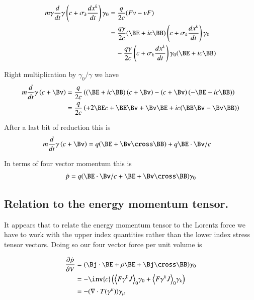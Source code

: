 \documentclass{article}
\begin{document}
\begin{align*}
m \gamma \frac{d}{dt} \gamma \left(c + \sigma_k \frac{dx^k}{dt}\right) \gamma_0
&= \frac{q}{2c}(F v - v F) \\
&=
\frac{q \gamma}{2c} 
(\BE + i c\BB) 
\left(c + \sigma_k \frac{dx^k}{dt}\right) \gamma_0
\\
&\quad -
\frac{q \gamma}{2c} 
\left(c + \sigma_k \frac{dx^k}{dt}\right) \gamma_0
(\BE + i c\BB) \\
\end{align*}

Right multiplication by $\gamma_0/\gamma$ we have
\begin{align*}
m \frac{d}{dt} \gamma \left(c + \Bv \right) 
&= \frac{q }{2c} \left( (\BE + i c\BB) \left(c + \Bv \right) -\left(c + \Bv \right) (-\BE + i c\BB) \right) \\
&= \frac{q }{2c} \left( 
+ 2 \BE c 
+ \BE \Bv  + \Bv \BE 
+ i c (\BB \Bv  - \Bv \BB)
\right) \\
\end{align*}

After a last bit of reduction this is
\begin{align}
m \frac{d}{dt} \gamma \left(c + \Bv \right) &= q (\BE + \Bv \cross \BB) + q \BE \cdot \Bv/c
\end{align}

In terms of four vector momentum this is
\begin{align}\label{eqn:lorentzForceVec}
\dot{p} = q ( \BE \cdot \Bv/c + \BE + \Bv \cross \BB ) \gamma_0
\end{align}

\subsection{ Relation to the energy momentum tensor. }

It appears that to relate the energy momentum tensor to the Lorentz force we have 
to work with the upper index quantities rather than the lower index stress tensor vectors.  Doing so
our four vector force per unit volume is
 
\begin{align}
\PD{V}{\dot{p}}
&= (\Bj \cdot \BE + \rho \BE + \Bj \cross \BB) \gamma_0 \\
&= - \inv{c} \left(\gpgradezero{ F \gamma^0 J } \gamma_0 + \gpgradezero{ F \gamma^k J } \gamma_k \right) \\
&= - (\grad \cdot T(\gamma^\mu)) \gamma_\mu
\end{align}
\end{document}
